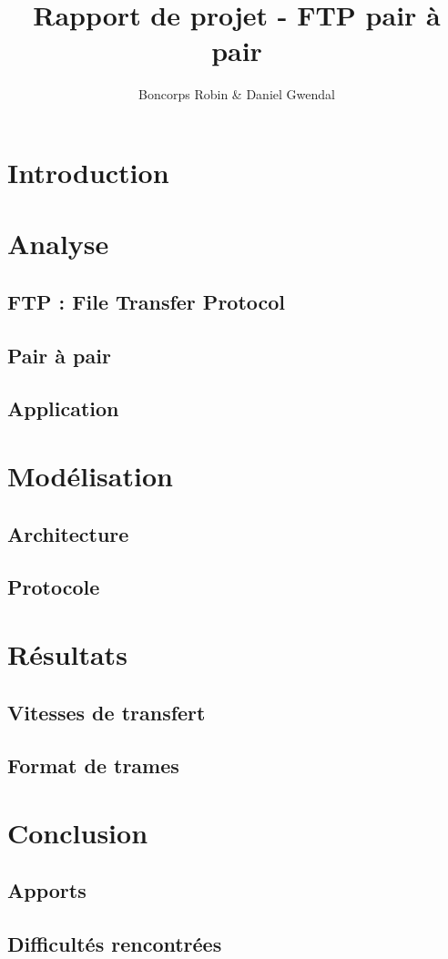 \documentclass[a4paper, 11pt, french]{report}
\author{Boncorps Robin \& Daniel Gwendal}
\title{Rapport de projet - FTP pair à pair}
\begin{document}
\maketitle

\chapter{Introduction}

\chapter{Analyse}
	\section{FTP : File Transfer Protocol}
	\section{Pair à pair}
	\section{Application}

\chapter{Modélisation}
	\section{Architecture}
	\section{Protocole}

\chapter{Résultats}
	\section{Vitesses de transfert}
	\section{Format de trames}

\chapter{Conclusion}
	\section{Apports} 
	\section{Difficultés rencontrées}
	
\end{document}
